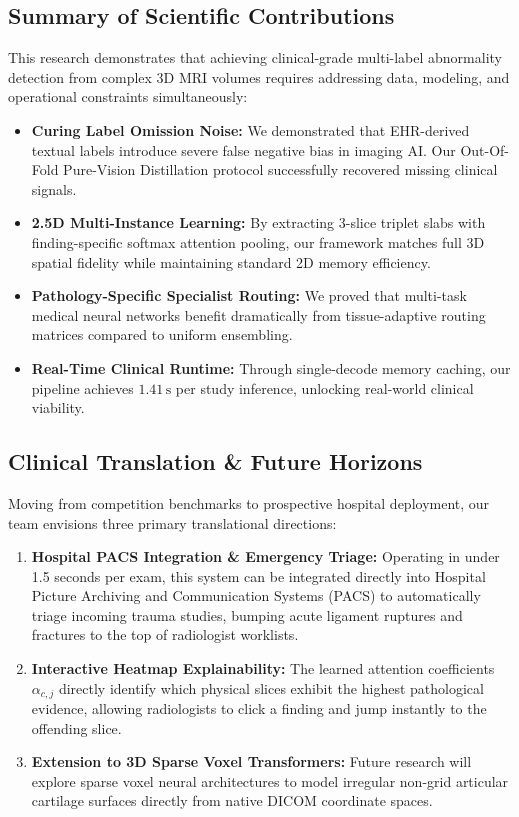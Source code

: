 \documentclass[11pt,a4paper]{article}
\begin{document}
\subsection{Summary of Scientific Contributions}
This research demonstrates that achieving clinical-grade multi-label abnormality detection from complex 3D MRI volumes requires addressing data, modeling, and operational constraints simultaneously:
\begin{itemize}[leftmargin=*]
    \item \textbf{Curing Label Omission Noise:} We demonstrated that EHR-derived textual labels introduce severe false negative bias in imaging AI. Our Out-Of-Fold Pure-Vision Distillation protocol successfully recovered missing clinical signals.
    \item \textbf{2.5D Multi-Instance Learning:} By extracting 3-slice triplet slabs with finding-specific softmax attention pooling, our framework matches full 3D spatial fidelity while maintaining standard 2D memory efficiency.
    \item \textbf{Pathology-Specific Specialist Routing:} We proved that multi-task medical neural networks benefit dramatically from tissue-adaptive routing matrices compared to uniform ensembling.
    \item \textbf{Real-Time Clinical Runtime:} Through single-decode memory caching, our pipeline achieves $1.41\,\text{s}$ per study inference, unlocking real-world clinical viability.
\end{itemize}

\subsection{Clinical Translation \& Future Horizons}
Moving from competition benchmarks to prospective hospital deployment, our team envisions three primary translational directions:
\begin{enumerate}
    \item \textbf{Hospital PACS Integration \& Emergency Triage:} Operating in under 1.5 seconds per exam, this system can be integrated directly into Hospital Picture Archiving and Communication Systems (PACS) to automatically triage incoming trauma studies, bumping acute ligament ruptures and fractures to the top of radiologist worklists.
    \item \textbf{Interactive Heatmap Explainability:} The learned attention coefficients $\alpha_{c,j}$ directly identify which physical slices exhibit the highest pathological evidence, allowing radiologists to click a finding and jump instantly to the offending slice.
    \item \textbf{Extension to 3D Sparse Voxel Transformers:} Future research will explore sparse voxel neural architectures to model irregular non-grid articular cartilage surfaces directly from native DICOM coordinate spaces.
\end{enumerate}
\end{document}
